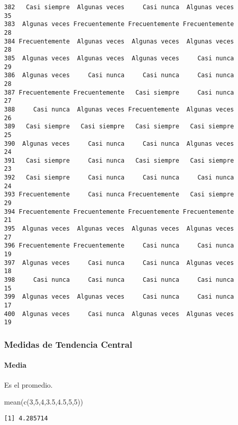\documentclass[
  letterpaper,
  DIV=11,
  numbers=noendperiod]{scrartcl}
\let\oldparagraph\paragraph
\renewcommand{\paragraph}[1]{\oldparagraph{#1}\mbox{}}
\newenvironment{Shaded}{\begin{snugshade}}{\end{snugshade}}
\newcommand{\DecValTok}[1]{\textcolor[rgb]{0.68,0.00,0.00}{#1}}
\newcommand{\FloatTok}[1]{\textcolor[rgb]{0.68,0.00,0.00}{#1}}
\newcommand{\FunctionTok}[1]{\textcolor[rgb]{0.28,0.35,0.67}{#1}}
\newcommand{\NormalTok}[1]{\textcolor[rgb]{0.00,0.23,0.31}{#1}}
\begin{document}
\begin{verbatim}
382   Casi siempre  Algunas veces     Casi nunca  Algunas veces      35
383  Algunas veces Frecuentemente Frecuentemente Frecuentemente      28
384 Frecuentemente  Algunas veces  Algunas veces  Algunas veces      28
385  Algunas veces  Algunas veces  Algunas veces     Casi nunca      29
386  Algunas veces     Casi nunca     Casi nunca     Casi nunca      28
387 Frecuentemente Frecuentemente   Casi siempre     Casi nunca      27
388     Casi nunca  Algunas veces Frecuentemente  Algunas veces      26
389   Casi siempre   Casi siempre   Casi siempre   Casi siempre      25
390  Algunas veces     Casi nunca     Casi nunca  Algunas veces      24
391   Casi siempre     Casi nunca   Casi siempre   Casi siempre      23
392   Casi siempre     Casi nunca     Casi nunca     Casi nunca      24
393 Frecuentemente     Casi nunca Frecuentemente   Casi siempre      29
394 Frecuentemente Frecuentemente Frecuentemente Frecuentemente      21
395  Algunas veces  Algunas veces  Algunas veces  Algunas veces      27
396 Frecuentemente Frecuentemente     Casi nunca     Casi nunca      19
397  Algunas veces     Casi nunca     Casi nunca  Algunas veces      18
398     Casi nunca     Casi nunca     Casi nunca     Casi nunca      15
399  Algunas veces  Algunas veces     Casi nunca     Casi nunca      17
400  Algunas veces     Casi nunca  Algunas veces  Algunas veces      19
\end{verbatim}

\subsubsection{Medidas de Tendencia
Central}\label{medidas-de-tendencia-central}

\paragraph{Media}\label{media}

Es el promedio.

\begin{Shaded}
\begin{Highlighting}[]
\FunctionTok{mean}\NormalTok{(}\FunctionTok{c}\NormalTok{(}\DecValTok{3}\NormalTok{,}\DecValTok{5}\NormalTok{,}\DecValTok{4}\NormalTok{,}\FloatTok{3.5}\NormalTok{,}\FloatTok{4.5}\NormalTok{,}\DecValTok{5}\NormalTok{,}\DecValTok{5}\NormalTok{))}
\end{Highlighting}
\end{Shaded}

\begin{verbatim}
[1] 4.285714
\end{verbatim}
\end{document}
